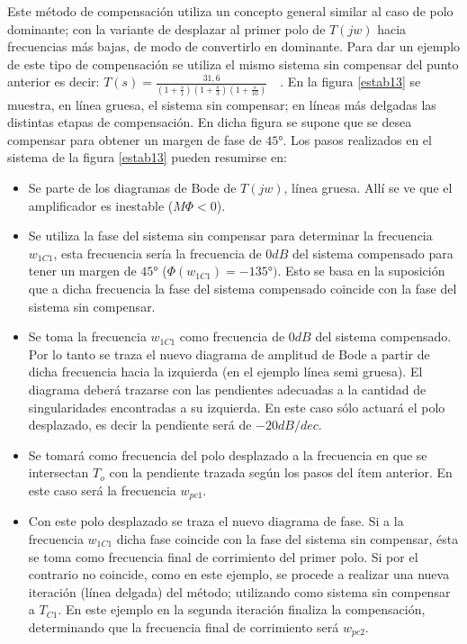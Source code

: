 \hspace{10pt} Este método de compensación utiliza un concepto general similar al
caso de polo dominante; con la variante de desplazar al primer polo
de $T(jw)$ hacia frecuencias más bajas, de modo de convertirlo en
dominante. Para dar un ejemplo de este tipo de compensación se
utiliza el mismo sistema sin compensar del punto anterior es decir:
$T(s)=\frac{\displaystyle 31,6}{\displaystyle (1+\frac{\displaystyle
		s}{\displaystyle 1})(1+\frac{\displaystyle s}{\displaystyle
		3})(1+\frac{\displaystyle s}{\displaystyle 10})}\quad$. En la figura
\ref{estab13} se muestra, en línea gruesa, el sistema sin compensar;
en líneas más delgadas las distintas etapas de compensación. En
dicha figura se supone que se desea compensar para obtener un margen
de fase de $45°$. Los pasos realizados en el sistema de la figura
\ref{estab13} pueden resumirse en:
\begin{itemize}
	\item Se parte de los diagramas de Bode de $T(jw)$, línea
	gruesa. Allí se ve que el amplificador es inestable ($M\Phi<0$).
	\item Se utiliza la fase del sistema sin compensar para
	determinar la frecuencia $w_{1C1}$, esta frecuencia sería la
	frecuencia de $0 dB$ del sistema compensado para tener un margen
	de $45°$ ($\Phi(w_{1C1})=-135°)$. Esto se basa en la suposición que a dicha frecuencia
	la fase del sistema compensado coincide con la fase del sistema
	sin compensar.
	\item Se toma la frecuencia $w_{1C1}$ como frecuencia de $0 dB$
	del sistema compensado. Por lo tanto se traza el nuevo diagrama de
	amplitud de Bode a partir de dicha frecuencia  hacia la
	izquierda (en el ejemplo línea semi gruesa). El diagrama deberá trazarse con las pendientes
	adecuadas a la cantidad de singularidades encontradas a su
	izquierda. En este caso sólo actuará el polo desplazado, es
	decir la pendiente será de $-20 dB/dec$.
	\item Se tomará como frecuencia del polo desplazado a la
	frecuencia en que se intersectan $T_o$ con la pendiente trazada
	según los pasos del ítem anterior. En este caso será la
	frecuencia $w_{pc1}$.
	\item Con este polo desplazado se traza el nuevo diagrama de
	fase. Si a la frecuencia  $w_{1C1}$ dicha fase coincide con la
	fase del sistema sin compensar, ésta se toma como frecuencia final de
	corrimiento del primer polo. Si por el contrario no coincide,
	como en este ejemplo, se procede a realizar una nueva iteración
	(línea delgada) del método; utilizando como sistema sin compensar a $T_{C1}$. En
	este ejemplo en la segunda iteración finaliza la compensación,
	determinando que la frecuencia final de corrimiento será
	$w_{pc2}$.
\end{itemize}

